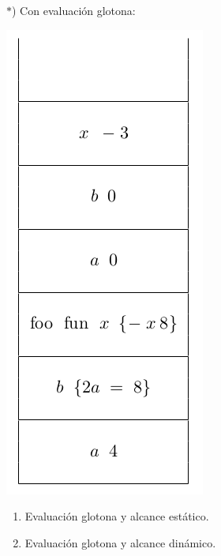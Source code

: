 \begin{multicols}{2}
  $*$) Con evaluación glotona:
  \begin{center}
    \includegraphics[scale=0.40]{./Glotona}
  \end{center}

  \begin{enumerate}
  \item Evaluación glotona y alcance estático.
  \item Evaluación glotona y alcance dinámico.
  \end{enumerate}

\end{multicols}


